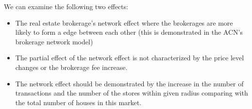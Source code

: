 













We can examine the following two effects:

\begin{itemize}
  \item The real estate brokerage's network effect where the brokerages are more likely to form a edge between each other (this is demonstrated in the ACN's brokerage network model)
  \item The partial effect of the network effect is not characterized by the price level changes or the brokerage fee increase.
  \item The network effect should be demonstrated by the increase in the number of transactions and the number of the stores within given radius comparing with the total number of houses in this market.
\end{itemize}
